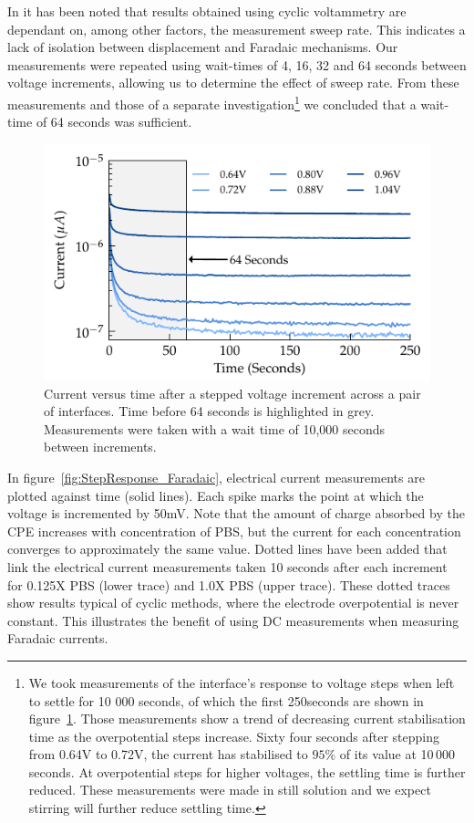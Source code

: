 \documentclass[journal, a4paper]{IEEEtran}
\begin{document}
In \cite{Cogan2008} it has been noted that results obtained using cyclic voltammetry are dependant on, among other factors, the measurement sweep rate. This indicates a lack of isolation between displacement and Faradaic mechanisms. Our measurements were repeated using wait-times of 4, 16, 32 and 64 seconds between voltage increments, allowing us to determine the effect of sweep rate. From these measurements and those of a separate investigation\footnote{We took measurements of the interface's response to voltage steps when left to settle for 10 000 seconds, of which the first 250\thinspace seconds are shown in figure~\ref{fig:CPE_currentVsTime}. Those measurements show a trend of decreasing current stabilisation time as the overpotential steps increase. Sixty four seconds after stepping from 0.64\thinspace V to 0.72\thinspace V, the current has stabilised to $95\%$ of its value at 10\,000 seconds. At overpotential steps for higher voltages, the settling time is further reduced. These measurements were made in still solution and we expect stirring will further reduce settling time.} we concluded that a wait-time of 64 seconds was sufficient.
\begin{figure}
    \begin{center}
        \includegraphics{graphics/CPE_currentVsTime}
    \end{center}
    \caption{Current versus time after a stepped voltage increment across a pair of interfaces. Time before 64 seconds is highlighted in grey. Measurements were taken with a wait time of 10,000 seconds between increments.}
    \label{fig:CPE_currentVsTime}
\end{figure}

In figure~\ref{fig:StepResponse_Faradaic}, electrical current measurements are plotted against time (solid lines). Each spike marks the point at which the voltage is incremented by 50\thinspace mV. Note that the amount of charge absorbed by the CPE increases with concentration of PBS, but the current for each concentration converges to approximately the same value. Dotted lines have been added that link the electrical current measurements taken 10 seconds after each increment for 0.125X PBS (lower trace) and 1.0X PBS (upper trace). These dotted traces show results typical of cyclic methods, where the electrode overpotential is never constant. This illustrates the benefit of using DC measurements when measuring Faradaic currents.
\end{document}
